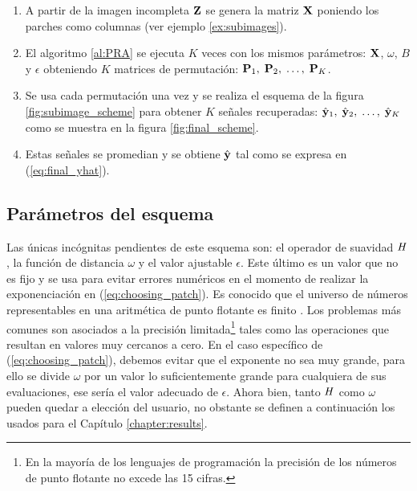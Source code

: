 \begin{enumerate}
	\item A partir de la imagen incompleta $\Z$ se genera la matriz $\X$ poniendo los parches como columnas (ver ejemplo \ref{ex:subimages}).
	\item El algoritmo \ref{al:PRA} se ejecuta $K$ veces con los mismos par\'ametros: $\X$, $\omega$, $B$ y $\epsilon$ obteniendo $K$ matrices de permutaci\'on: $\P_1,\; \P_2,\; \dots,\; \P_K$.
	\item Se usa cada permutaci\'on una vez y se realiza el esquema de la figura \ref{fig:subimage_scheme} para obtener $K$ señales recuperadas: $\yhat_1,\; \yhat_2,\; \dots,\; \yhat_K$ como se muestra en la figura \ref{fig:final_scheme}.
	\item Estas señales se promedian y se obtiene $\yhat$ tal como se expresa en (\ref{eq:final_yhat}).
\end{enumerate}

\subsection{Par\'ametros del esquema}
Las \'unicas incógnitas pendientes de este esquema son: el operador de suavidad $\H$, la funci\'on de distancia $\omega$ y el valor ajustable $\epsilon$. Este \'ultimo es un valor que no es fijo y se usa para evitar errores num\'ericos en el momento de realizar la exponenciaci\'on en (\ref{eq:choosing_patch}). Es conocido que el universo de números representables en una aritmética de punto flotante es finito \cite{conte2017elementary}. Los problemas m\'as comunes son asociados a la precisión limitada\footnote{En la mayoría de los lenguajes de programación la precisión de los n\'umeros de punto flotante no excede las 15 cifras.} tales como las operaciones que resultan en valores muy cercanos a cero. En el caso espec\'ifico de (\ref{eq:choosing_patch}), debemos evitar que el exponente no sea muy grande, para ello se divide $\omega$ por un valor lo suficientemente grande para cualquiera de sus evaluaciones, ese ser\'ia el valor adecuado de $\epsilon$. Ahora bien, tanto $\H$ como $\omega$ pueden quedar a elecci\'on del usuario, no obstante se definen a continuaci\'on los usados para el Cap\'itulo \ref{chapter:results}.

